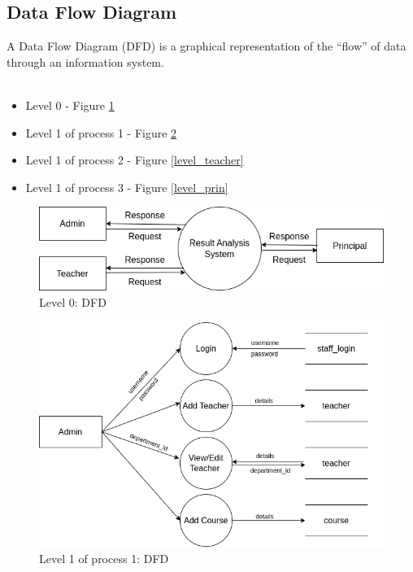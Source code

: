 \documentclass{nascproject}
\begin{document}
\subsection{Data Flow Diagram}
A Data Flow Diagram (DFD) is a graphical representation of the “flow” of data through
an information system.\\\\
\begin{itemize}
	\item Level 0 - Figure \ref{level_zero}
	\item Level 1 of process 1 - Figure \ref{level_one}
	\item Level 1 of process 2 - Figure \ref{level_teacher}
	\item Level 1 of process 3 - Figure \ref{level_prin}
\end{itemize}
\begin{figure}
	\centering
	\includegraphics[width=1\linewidth]{level_zero.jpg}
	\caption{Level 0: DFD}
	
	\label{level_zero}
\end{figure}
\begin{figure}
	\centering
	\includegraphics[width=1\linewidth]{level_admin.png}
	\caption{Level 1 of process 1: DFD}
	\label{level_one}
\end{figure}
\end{document}
